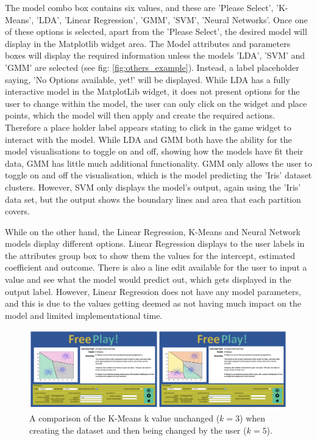 		The model combo box contains six values, and these are 'Please Select', 'K-Means', 'LDA', 'Linear Regression', 'GMM', 'SVM', 'Neural Networks'. Once one of these options is selected, apart from the 'Please Select', the desired model will display in the Matplotlib widget area. The Model attributes and parameters boxes will display the required information unless the models 'LDA', 'SVM' and 'GMM' are selected (see fig: \ref{fig:others_example}). Instead, a label placeholder saying, 'No Options available, yet!' will be displayed. While LDA has a fully interactive model in the MatplotLib widget, it does not present options for the user to change within the model, the user can only click on the widget and place points, which the model will then apply and create the required actions. Therefore a place holder label appears stating to click in the game widget to interact with the model. While LDA and GMM both have the ability for the model visualisations to toggle on and off, showing how the models have fit their data, GMM has little much additional functionality. GMM only allows the user to toggle on and off the visualisation, which is the model predicting the 'Iris' dataset clusters. However, SVM only displays the model's output, again using the 'Iris' data set, but the output shows the boundary lines and area that each partition covers.
		
		While on the other hand, the Linear Regression, K-Means and Neural Network models display different options. Linear Regression displays to the user labels in the attributes group box to show them the values for the intercept, estimated coefficient and outcome. There is also a line edit available for the user to input a value and see what the model would predict out, which gets displayed in the output label. However, Linear Regression does not have any model parameters, and this is due to the values getting deemed as not having much impact on the model and limited implementational time. 
		
		\begin{figure}[t]
			\begin{center}
				\includegraphics[width=13cm]{graphics/chaning_k_fp_example.png}
				\caption{A comparison of the K-Means k value unchanged ($k=3$) when creating the dataset and then being changed by the user ($k=5$).}
				\label{fig:km_example}
			\end{center}
		\end{figure}
		

